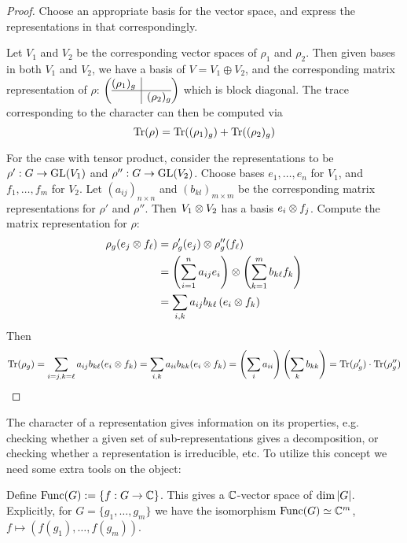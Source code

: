\begin{proof}
    Choose an appropriate basis for the vector space, and express the representations in that correspondingly.

    Let $V_1$ and $V_2$ be the corresponding vector spaces of $\rho_1$ and $\rho_2$. Then given bases in both $V_1$ and $V_2$, we have a basis of $V = V_1 \oplus V_2$, and the corresponding matrix representation of $\rho$:
    $
    \left(\begin{array}{@{}c|c@{}}
        (\rho_1)_g & \\ \hline
        & (\rho_2)_g \\
      \end{array}\right)
    $
    which is block diagonal. The trace corresponding to the character can then be computed via
    \[
        \operatorname{Tr}(\rho) = \operatorname{Tr}((\rho_1)_g) + \operatorname{Tr}((\rho_2)_g)
    \]

    For the case with tensor product, consider the representations to be $\rho': G \to \mathrm{GL}(V_1)$ and $\rho'': G \to \mathrm{GL}(V_2)$. Choose bases $e_1, \dots, e_n$ for $V_1$, and $f_1, \dots, f_m$ for $V_2$. Let $(a_{ij})_{n \times n}$ and $(b_{kl})_{m \times m}$ be the corresponding matrix representations for $\rho'$ and $\rho''$. Then $V_1 \otimes V_2$ has a basis $e_i \otimes f_j$. Compute the matrix representation for $\rho$:
    \begin{align*}
        \rho_g(e_j \otimes f_{\ell})
        & = \rho_g'(e_j) \otimes \rho_g'' (f_{\ell}) \\
        & = \left( \sum_{i = 1}^n a_{ij} e_i \right) \otimes \left( \sum_{k = 1}^m b_{k\ell} f_k \right) \\
        & = \sum_{i, k} a_{ij} b_{k\ell} \left( e_i \otimes f_k \right)
    \end{align*}
    Then
    \[
        \operatorname{Tr}(\rho_g) = \sum_{i = j, k = \ell} a_{ij} b_{k\ell} (e_i \otimes f_k) = \sum_{i, k} a_{ii} b_{kk} (e_i \otimes f_k) = \left( \sum_{i} a_{ii} \right) \left( \sum_{k} b_{kk} \right) = \operatorname{Tr}(\rho_g')\cdot\operatorname{Tr}(\rho_g'')
    \]
\end{proof}

\textstart
The character of a representation gives information on its properties, e.g. checking whether a given set of sub-representations gives a decomposition, or checking whether a representation is irreducible, etc. To utilize this concept we need some extra tools on the object:

\begin{notation}
    Define $\mathrm{Func}(G) := \{ f: G \to \mathbb{C} \}$. This gives a $\mathbb{C}$-vector space of $\dim \left|G\right|$. Explicitly, for $G = \{g_1, \dots, g_m\}$ we have the isomorphism $\mathrm{Func}(G) \simeq \mathbb{C}^m$, $f \mapsto (f(g_1), \dots, f(g_m))$.
\end{notation}

